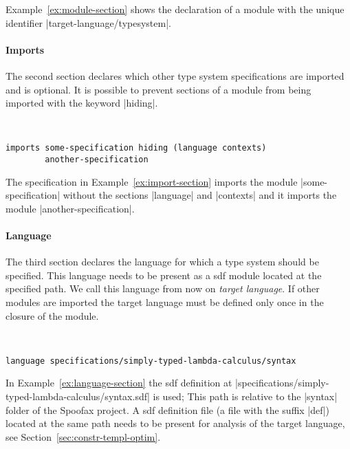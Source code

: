 Example~\ref{ex:module-section} shows the declaration of a module with
the unique identifier \code|target-language/typesystem|.

\paragraph{Imports} The second section declares which other type
system specifications are imported and is optional. It is possible to
prevent sections of a module from being imported with the keyword
\code|hiding|.

\begin{example}{~}
\begin{lstlisting}[language=sltc]    
imports some-specification hiding (language contexts)
        another-specification
\end{lstlisting}
\label{ex:import-section}
\end{example}

The specification in Example~\ref{ex:import-section} imports the
module \code|some-specification| without the sections \code|language|
and \code|contexts| and it imports the module
\code|another-specification|.

\paragraph{Language} The third section declares the language for which
a type system should be specified. This language needs to be present
as a \gls{sdf} module located at the specified path. We call this
language from now on \emph{target language}. If other modules are
imported the target language must be defined only once in the closure
of the module.

\begin{example}{~}
\begin{lstlisting}[language=sltc]
language specifications/simply-typed-lambda-calculus/syntax
\end{lstlisting}
\label{ex:language-section}
\end{example}

In Example~\ref{ex:language-section} the \gls{sdf} definition at
\code|specifications/simply-typed-lambda-calculus/syntax.sdf| is used;
This path is relative to the \code|syntax| folder of the Spoofax
project. A \gls{sdf} definition file (a file with the suffix
\code|def|) located at the same path needs to be present for analysis
of the target language, see Section~\ref{sec:constr-templ-optim}.

